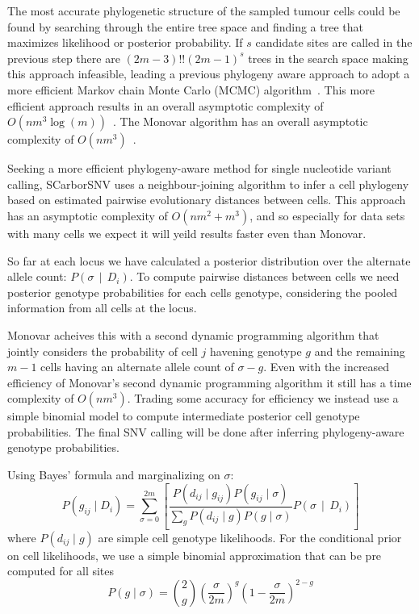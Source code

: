 \documentclass[../../main.tex]{subfiles}
\begin{document}
The most accurate phylogenetic structure of the sampled tumour cells could be found by searching through the entire tree space and finding a tree that maximizes likelihood or posterior probability.
If $s$ candidate sites are called in the previous step there are $(2m-3)!!(2m-1)^s$ trees in the search space making this approach infeasible, leading a previous phylogeny aware approach to adopt a more efficient Markov chain Monte Carlo (MCMC) algorithm~\cite{sciphi}.
This more efficient approach results in an overall asymptotic complexity of $O(nm^3\log(m))$~\cite{sciphi}.
The Monovar algorithm has an overall asymptotic complexity of $O(nm^3)$~\cite{monovar}.

Seeking a more efficient phylogeny-aware method for single nucleotide variant calling, SCarborSNV uses a neighbour-joining algorithm to infer a cell phylogeny based on estimated pairwise evolutionary distances between cells.
This approach has an asymptotic complexity of $O(nm^2+m^3)$, and so especially for data sets with many cells we expect it will yeild results faster even than Monovar.

So far at each locus we have calculated a posterior distribution over the alternate allele count: $P(\sigma\,\mid\,D_i)$.
To compute pairwise distances between cells we need posterior genotype probabilities for each cells genotype, considering the pooled information from all cells at the locus.

Monovar acheives this with a second dynamic programming algorithm that jointly considers the probability of cell $j$ havening genotype $g$ and the remaining $m-1$ cells having an alternate allele count of $\sigma - g$.
Even with the increased efficiency of Monovar's second dynamic programming algorithm it still has a time complexity of $O(nm^3)$.
Trading some accuracy for efficiency we instead use a simple binomial model to compute intermediate posterior cell genotype probabilities. 
The final SNV calling will be done after inferring phylogeny-aware genotype probabilities.

Using Bayes' formula and marginalizing on $\sigma$:
\begin{equation*}
P(g_{ij}\mid D_i) = \sum_{\sigma=0}^{2m}  \left[ \frac{P(d_{ij}\mid g_{ij})P(g_{ij}\mid \sigma)}{\sum_g P(d_{ij}\mid g)P(g \mid \sigma)}  P(\sigma\,\mid\,D_i)\right]
\end{equation*}
where $P(d_{ij}\mid g)$ are simple cell genotype likelihoods.
For the conditional prior on cell likelihoods, we use a simple binomial approximation that can be pre computed for all sites
\begin{equation*}
P(g\mid \sigma) = \binom{2}{g} \left(\frac{\sigma}{2m}\right)^g \left(1-\frac{\sigma}{2m}\right)^{2-g}
\end{equation*}
\end{document}
